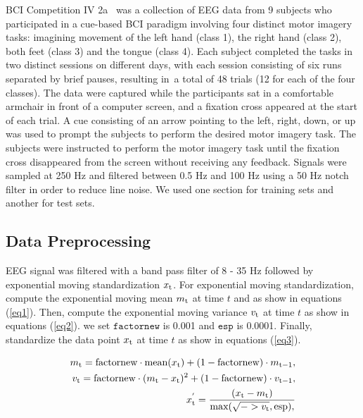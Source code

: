 \documentclass[runningheads]{llncs}
\begin{document}
BCI Competition IV 2a \cite{brunner2008bci} was a collection of EEG data from 9 subjects who participated in a cue-based BCI paradigm involving four distinct motor imagery tasks: imagining movement of the left hand (class 1), the right hand (class 2), both feet (class 3) and the tongue (class 4). Each subject completed the tasks in two distinct sessions on different days, with each session consisting of six runs separated by brief pauses, resulting in a total of 48 trials (12 for each of the four classes). The data were captured while the participants sat in a comfortable armchair in front of a computer screen, and a fixation cross appeared at the start of each trial. A cue consisting of an arrow pointing to the left, right, down, or up was used to prompt the subjects to perform the desired motor imagery task. The subjects were instructed to perform the motor imagery task until the fixation cross disappeared from the screen without receiving any feedback. Signals were sampled at 250 Hz and filtered between 0.5 Hz and 100 Hz using a 50 Hz notch filter in order to reduce line noise. We used one section for training sets and another for test sets.

\subsection{Data Preprocessing}
EEG signal was filtered with a band pass filter of 8 - 35 Hz followed by exponential moving standardization $x_{\rm t}$. For exponential moving standardization, compute the exponential moving mean $m_{\rm t}$ at time $t$ and as show in equations (\ref{eq1}).
Then, compute the exponential moving variance $v_{\rm t}$ at time $t$ as show in equations (\ref{eq2}).
we set $\texttt{factornew}$ is 0.001 and $\texttt{esp}$ is 0.0001. Finally, standardize the data point $x_{\rm t}$ at time $t$ as show in equations (\ref{eq3}).

\begin{eqnarray} 
m_{\rm t} = \text{factornew} \cdot \text{mean}(x_{\rm t}) + (1 - \text{factornew}) \cdot m_{\rm t-1}, \label{eq1}\\
v_{\rm t} = \text{factornew}\cdot (m_{\rm t} - x_{\rm t})^{2} + (1 - \text{factornew}) \cdot v_{\rm t-1} , \label{eq2} \\ 
x_{\rm t}^{'}  = \frac{(x_{\rm t}-m_{\rm t})}{\text{max}(\sqrt{->v_{\rm t}},\text{esp}), \label{eq3} }
\end{eqnarray}
\end{document}
